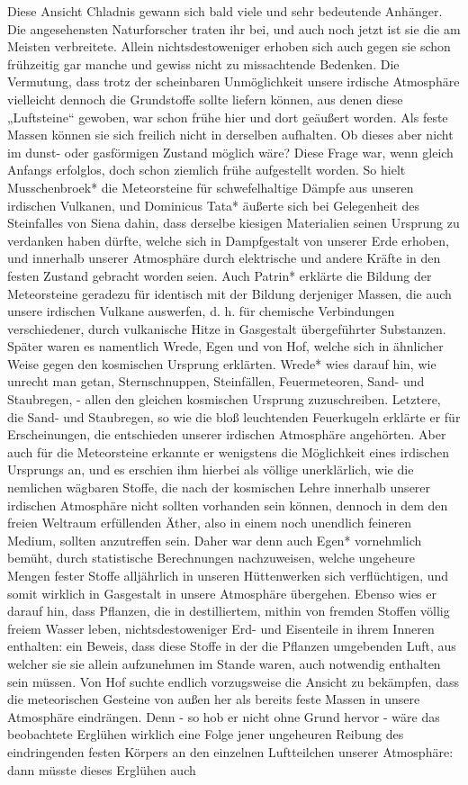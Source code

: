 \documentclass[a4paper, 11pt, oneside, polutonikogreek, german]{article}
\begin{document}
Diese Ansicht Chladnis gewann sich bald viele und sehr bedeutende Anhänger. Die angesehensten Naturforscher traten ihr bei, und auch noch jetzt ist sie die am Meisten verbreitete. Allein nichtsdestoweniger erhoben sich auch gegen sie schon frühzeitig gar manche und gewiss nicht zu missachtende Bedenken. Die Vermutung, dass trotz der scheinbaren Unmöglichkeit unsere irdische Atmosphäre vielleicht dennoch die Grundstoffe sollte liefern können, aus denen diese „Luftsteine“ gewoben, war schon frühe hier und dort geäußert worden. Als feste Massen können sie sich freilich nicht in derselben aufhalten. Ob dieses aber nicht im dunst- oder gasförmigen Zustand möglich wäre? Diese Frage war, wenn gleich Anfangs erfolglos, doch schon ziemlich frühe aufgestellt worden. So hielt Musschenbroek* die Meteorsteine für schwefelhaltige Dämpfe aus unseren irdischen Vulkanen, und Dominicus Tata* äußerte sich bei Gelegenheit des Steinfalles von Siena dahin, dass derselbe kiesigen Materialien seinen Ursprung zu verdanken haben dürfte, welche sich in Dampfgestalt von unserer Erde erhoben, und innerhalb unserer Atmosphäre durch elektrische und andere Kräfte in den festen Zustand gebracht worden seien. Auch Patrin* erklärte die Bildung der Meteorsteine geradezu für identisch mit der Bildung derjeniger Massen, die auch unsere irdischen Vulkane auswerfen, d. h. für chemische Verbindungen verschiedener, durch vulkanische Hitze in Gasgestalt übergeführter Substanzen. Später waren es namentlich Wrede, Egen und von Hof, welche sich in ähnlicher Weise gegen den kosmischen Ursprung erklärten. Wrede* wies darauf hin, wie unrecht man getan, Sternschnuppen, Steinfällen, Feuermeteoren, Sand- und Staubregen, - allen den gleichen kosmischen Ursprung zuzuschreiben. Letztere, die Sand- und Staubregen, so wie die bloß leuchtenden Feuerkugeln erklärte er für Erscheinungen, die entschieden unserer irdischen Atmosphäre angehörten. Aber auch für die Meteorsteine erkannte er wenigstens die Möglichkeit eines irdischen Ursprungs an, und es erschien ihm hierbei als völlige unerklärlich, wie die nemlichen wägbaren Stoffe, die nach der kosmischen Lehre innerhalb unserer irdischen Atmosphäre nicht sollten vorhanden sein können, dennoch in dem den freien Weltraum erfüllenden Äther, also in einem noch unendlich feineren Medium, sollten anzutreffen sein. Daher war denn auch Egen* vornehmlich bemüht, durch statistische Berechnungen nachzuweisen, welche ungeheure Mengen fester Stoffe alljährlich in unseren Hüttenwerken sich verflüchtigen, und somit wirklich in Gasgestalt in unsere Atmosphäre übergehen. Ebenso wies er darauf hin, dass Pflanzen, die in destilliertem, mithin von fremden Stoffen völlig freiem Wasser leben, nichtsdestoweniger Erd- und Eisenteile in ihrem Inneren enthalten: ein Beweis, dass diese Stoffe in der die Pflanzen umgebenden Luft, aus welcher sie sie allein aufzunehmen im Stande waren, auch notwendig enthalten sein müssen. Von Hof suchte endlich vorzugsweise die Ansicht zu bekämpfen, dass die meteorischen Gesteine von außen her als bereits feste Massen in unsere Atmosphäre eindrängen. Denn - so hob er nicht ohne Grund hervor - wäre das beobachtete Erglühen wirklich eine Folge jener ungeheuren Reibung des eindringenden festen Körpers an den einzelnen Luftteilchen unserer Atmosphäre: dann müsste dieses Erglühen auch 
\end{document}
